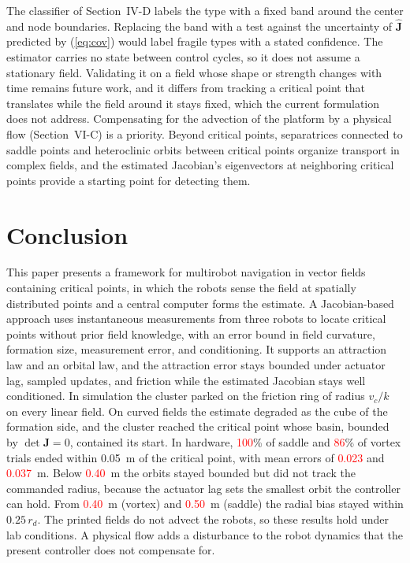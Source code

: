 \documentclass[lettersize,journal]{IEEEtran}
\newcommand{\syn}[1]{\textcolor{red}{#1}}            %
\begin{document}
The classifier of Section~IV-D labels the type with a fixed band around the center and node boundaries. Replacing the band with a test against the uncertainty of $\hat{\mathbf{J}}$ predicted by (\ref{eq:cov}) would label fragile types with a stated confidence. The estimator carries no state between control cycles, so it does not assume a stationary field. Validating it on a field whose shape or strength changes with time remains future work, and it differs from tracking a critical point that translates while the field around it stays fixed, which the current formulation does not address. Compensating for the advection of the platform by a physical flow (Section~VI-C) is a priority. Beyond critical points, separatrices connected to saddle points and heteroclinic orbits between critical points organize transport in complex fields, and the estimated Jacobian's eigenvectors at neighboring critical points provide a starting point for detecting them.

\section{Conclusion}
\noindent

This paper presents a framework for multirobot navigation in vector fields containing critical points, in which the robots sense the field at spatially distributed points and a central computer forms the estimate. A Jacobian-based approach uses instantaneous measurements from three robots to locate critical points without prior field knowledge, with an error bound in field curvature, formation size, measurement error, and conditioning. It supports an attraction law and an orbital law, and the attraction error stays bounded under actuator lag, sampled updates, and friction while the estimated Jacobian stays well conditioned. In simulation the cluster parked on the friction ring of radius $v_c/k$ on every linear field. On curved fields the estimate degraded as the cube of the formation side, and the cluster reached the critical point whose basin, bounded by $\det\mathbf{J} = 0$, contained its start. In hardware, \syn{100}\% of saddle and \syn{86}\% of vortex trials ended within 0.05~m of the critical point, with mean errors of \syn{0.023} and \syn{0.037}~m. Below \syn{0.40}~m the orbits stayed bounded but did not track the commanded radius, because the actuator lag sets the smallest orbit the controller can hold. From \syn{0.40}~m (vortex) and \syn{0.50}~m (saddle) the radial bias stayed within $0.25\,r_d$. The printed fields do not advect the robots, so these results hold under lab conditions. A physical flow adds a disturbance to the robot dynamics that the present controller does not compensate for. %
\end{document}
